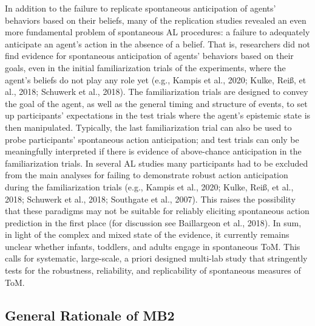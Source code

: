 \documentclass[
  man,floatsintext]{apa6}
\begin{document}
In addition to the failure to replicate spontaneous anticipation of agents' behaviors based on their beliefs, many of the replication studies revealed an even more fundamental problem of spontaneous AL procedures: a failure to adequately anticipate an agent's action in the absence of a belief. That is, researchers did not find evidence for spontaneous anticipation of agents' behaviors based on their goals, even in the initial familiarization trials of the experiments, where the agent's beliefs do not play any role yet (e.g., Kampis et al., 2020; Kulke, Reiß, et al., 2018; Schuwerk et al., 2018). The familiarization trials are designed to convey the goal of the agent, as well as the general timing and structure of events, to set up participants' expectations in the test trials where the agent's epistemic state is then manipulated. Typically, the last familiarization trial can also be used to probe participants' spontaneous action anticipation; and test trials can only be meaningfully interpreted if there is evidence of above-chance anticipation in the familiarization trials. In several AL studies many participants had to be excluded from the main analyses for failing to demonstrate robust action anticipation during the familiarization trials (e.g., Kampis et al., 2020; Kulke, Reiß, et al., 2018; Schuwerk et al., 2018; Southgate et al., 2007). This raises the possibility that these paradigms may not be suitable for reliably eliciting spontaneous action prediction in the first place (for discussion see Baillargeon et al., 2018).
In sum, in light of the complex and mixed state of the evidence, it currently remains unclear whether infants, toddlers, and adults engage in spontaneous ToM. This calls for systematic, large-scale, a priori designed multi-lab study that stringently tests for the robustness, reliability, and replicability of spontaneous measures of ToM.

\subsection{General Rationale of MB2}\label{general-rationale-of-mb2}
\end{document}

